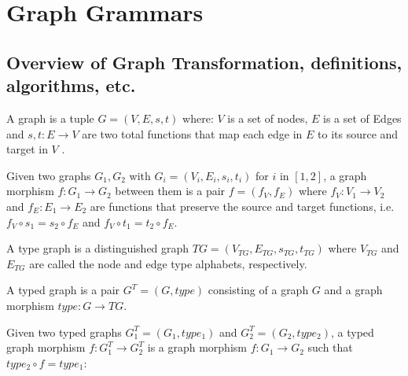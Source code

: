 \chapter{Graph Grammars}

\section{Overview of Graph Transformation, definitions, algorithms, etc.}

\begin{intuition}
\end{intuition}

\begin{definition}[Graph] A graph is a tuple $G = (V,E,s,t)$ where: $V$ is a set of nodes, $E$ is a set of Edges and $s,t : E \rightarrow V$ are two total functions that map each edge in $E$ to its source and target in $V$%
.

\end{definition}

\begin{example}[Graph]
\end{example}

\begin{definition} Given two graphs $G_1,G_2$ with $G_i = (V_i, E_i, s_i, t_i)$ for $i$ in $[1,2]$, a graph morphism $f : G_1 \rightarrow G_2$ between them is a pair $f = (f_V,f_E)$ where $f_V : V_1 \rightarrow V_2$ and $f_E : E_1 \rightarrow E_2$ are functions that preserve the source and target functions, i.e. $f_V \circ s_1 = s_2 \circ f_E$ and $f_V \circ t_1 = t_2 \circ f_E$.  
\end{definition}

\begin{definition} A type graph is a distinguished graph $TG = (V_{TG},E_{TG},s_{TG},t_{TG})$ where $V_{TG}$ and $E_{TG}$ are called the node and edge type alphabets, respectively.

  A typed graph is a pair $G^T = (G, type)$ consisting of a graph $G$ and a graph morphism $type : G \rightarrow TG$.

  Given two typed graphs $G^T_1 = (G_1,type_1)$ and $G^T_2 =(G_2,type_2)$, a typed graph morphism $f : G^T_1 \rightarrow G^T_2$ is a graph morphism $f : G_1 \rightarrow G_2$ such that $type_2 \circ f = type_1$:


\end{definition}

